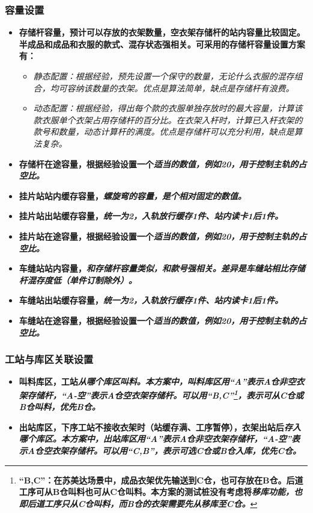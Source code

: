 	\subsubsection{容量设置}
	\begin{itemize}
		\item \bf{存储杆容量}，预计可以存放的衣架数量，空衣架存储杆的站内容量比较固定。半成品和成品和衣服的款式、混存状态强相关。可采用的存储杆容量设置方案有：
		\begin{itemize}
			\item \it{静态配置}：根据经验，预先设置一个保守的数量，无论什么衣服的混存组合，均可容纳该数量的衣架。优点是算法简单，缺点是存储杆有浪费。
			\item \it{动态配置}：根据经验，得出每个款的衣服单独存放时的最大容量，计算该款衣服单个衣架占用存储杆的百分比。在衣架入杆时，计算已入杆衣架的款号和数量，动态计算杆的满度。优点是存储杆可以充分利用，缺点是算法复杂。
		\end{itemize}
		
		\item \bf{存储杆在途容量}，根据经验设置一个\it{适当的数值，例如20}，用于控制主轨的占空比。
		\item \bf{挂片站站内缓存容量}，\it{螺旋弯的容量}，是个相对固定的数值。
		\item \bf{挂片站出站缓存容量}，\it{统一为2}，入轨放行缓存1件、站内读卡1后1件。
		\item \bf{挂片站在途容量}，根据经验设置一个\it{适当的数值，例如20}，用于控制主轨的占空比。
		\item \bf{车缝站站内容量}，\it{和存储杆容量类似}，和款号强相关。差异是车缝站相比存储杆混存度低（单件订制除外）。
		\item \bf{车缝站出站缓存容量}，\it{统一为2}，入轨放行缓存1件、站内读卡1后1件。
		\item \bf{车缝站在途容量}，根据经验设置一个\it{适当的数值，例如20}，用于控制主轨的占空比。
	\end{itemize}


	\subsubsection{工站与库区关联设置}
	\begin{itemize}
		\item \bf{叫料库区}，工站\it{从哪个库区叫料}。本方案中，叫料库区用\it{“A”}表示A仓非空衣架存储杆，\it{“A-空”}表示A仓空衣架存储杆。可以用\it{“B,C”}\footnote{\bf{“B,C”}：在苏美达场景中，成品衣架优先输送到C仓，也可存放在B仓。后道工序可从B仓叫料也可从C仓叫料。本方案的测试桩没有考虑将\it{移库}功能，也即后道工序只从C仓叫料，而B仓的衣架需要先从移库至C仓。}，表示可从C仓或B仓叫料，优先B仓。
		\item \bf{出站库区}，下序工站不接收衣架时（站缓存满、工序暂停），衣架出站后\it{存入哪个库区}。本方案中，出站库区用\it{“A”}表示A仓非空衣架存储杆，\it{“A-空”}表示A仓空衣架存储杆。可以用\it{“C,B”}，表示可选C仓或B仓入库，优先C仓。
	\end{itemize}

